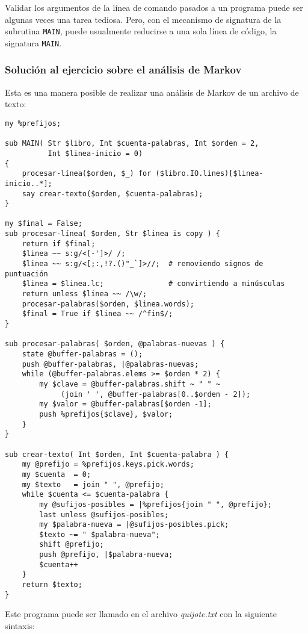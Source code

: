 Validar los argumentos de la línea de comando pasados a un programa
puede ser algunas veces una tarea tediosa. Pero, con el mecanismo 
de signatura de la subrutina {\tt MAIN}, puede usualmente reducirse
a una sola línea de código, la signatura {\tt MAIN}.

\subsubsection{Solución al ejercicio sobre el análisis de Markov}

Esta es una manera posible de realizar una análisis de Markov 
de un archivo de texto:

\begin{verbatim}
my %prefijos;

sub MAIN( Str $libro, Int $cuenta-palabras, Int $orden = 2, 
          Int $linea-inicio = 0)
{
    procesar-línea($orden, $_) for ($libro.IO.lines)[$linea-inicio..*]; 
    say crear-texto($orden, $cuenta-palabras);
}

my $final = False;
sub procesar-línea( $orden, Str $linea is copy ) {
    return if $final;
    $linea ~~ s:g/<[-']>/ /; 
    $linea ~~ s:g/<[;:,!?.()"_`]>//;  # removiendo signos de puntuación
    $linea = $linea.lc;               # convirtiendo a minúsculas
    return unless $linea ~~ /\w/;
    procesar-palabras($orden, $linea.words);
    $final = True if $linea ~~ /^fin$/;
}

sub procesar-palabras( $orden, @palabras-nuevas ) {
    state @buffer-palabras = ();
    push @buffer-palabras, |@palabras-nuevas;
    while (@buffer-palabras.elems >= $orden * 2) {
        my $clave = @buffer-palabras.shift ~ " " ~ 
             (join ' ', @buffer-palabras[0..$orden - 2]);
        my $valor = @buffer-palabras[$orden -1];
        push %prefijos{$clave}, $valor;
    }
}

sub crear-texto( Int $orden, Int $cuenta-palabra ) {
    my @prefijo = %prefijos.keys.pick.words;
    my $cuenta  = 0;
    my $texto   = join " ", @prefijo;
    while $cuenta <= $cuenta-palabra {
        my @sufijos-posibles = |%prefijos{join " ", @prefijo};
        last unless @sufijos-posibles;
        my $palabra-nueva = |@sufijos-posibles.pick;
        $texto ~= " $palabra-nueva";
        shift @prefijo;
        push @prefijo, |$palabra-nueva;
        $cuenta++
    }
    return $texto;
}     
\end{verbatim}

Este programa puede ser llamado en el archivo  \emph{quijote.txt} con la
siguiente sintaxis:

